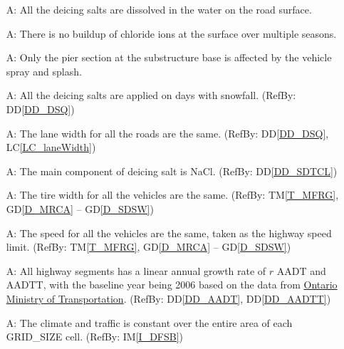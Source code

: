 \documentclass[12pt]{article}
\newcommand{\dref}[1]{GD\ref{#1}}
\newcommand{\ddref}[1]{DD\ref{#1}}
\newcommand{\tref}[1]{TM\ref{#1}}
\newcounter{assumpnum} %
\newcommand{\iref}[1]{IM\ref{#1}}
\newcommand{\lcref}[1]{LC\ref{#1}}
\begin{document}
\begin{itemize}
\item[A\refstepcounter{assumpnum}\theassumpnum \label{A_dissolve}:] All the deicing salts are dissolved in the water on the road surface.

\item[A\refstepcounter{assumpnum}\theassumpnum \label{A_buildup}:] There is no buildup of chloride ions at the surface over multiple seasons.

\item[A\refstepcounter{assumpnum}\theassumpnum \label{A_pier}:] Only the pier section at the substructure base is affected by the vehicle spray and splash.

\item[A\refstepcounter{assumpnum}\theassumpnum \label{A_deicingSalts}:] All the deicing salts are applied on days with snowfall. (RefBy: \ddref{DD_DSQ})

\item[A\refstepcounter{assumpnum}\theassumpnum \label{A_laneWidth}:] The lane width for all the roads are the same. (RefBy: \ddref{DD_DSQ}, \lcref{LC_laneWidth})

\item[A\refstepcounter{assumpnum}\theassumpnum \label{A_NaCl}:] The main component of deicing salt is NaCl. (RefBy: \ddref{DD_SDTCL})

\item[A\refstepcounter{assumpnum}\theassumpnum \label{A_tireWidth}:] The tire width for all the vehicles are the same. (RefBy: \tref{T_MFRG},  \dref{D_MRCA} -- \dref{D_SDSW})

\item[A\refstepcounter{assumpnum}\theassumpnum \label{A_Speed}:] The speed for all the vehicles are the same, taken as the highway speed limit. (RefBy: \tref{T_MFRG}, \dref{D_MRCA} -- \dref{D_SDSW})

\item[A\refstepcounter{assumpnum}\theassumpnum \label{A_LinearGrowthTraffic}:]  All highway segments has a linear annual growth rate of $r$ AADT and AADTT, with the baseline year being 2006 based on the data from \href{https://icorridor-mto-on-ca.hub.arcgis.com/apps/50798e771bd0440dbc96fd85d8fde9a5/explore}{Ontario Ministry of Transportation}. (RefBy: \ddref{DD_AADT}, \ddref{DD_AADTT})

\item[A\refstepcounter{assumpnum}\theassumpnum \label{A_Data}:] The climate and traffic is constant over the entire area of each GRID\_SIZE cell. (RefBy: \iref{I_DFSB})


\end{itemize}
\end{document}
